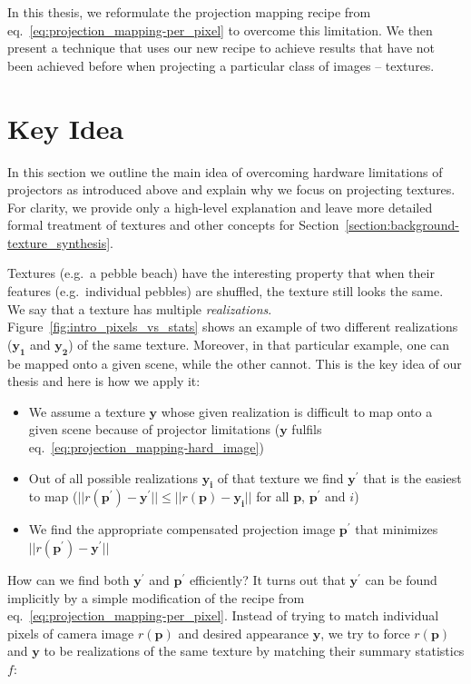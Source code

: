 In this thesis, we reformulate the projection mapping recipe from eq.~\ref{eq:projection_mapping-per_pixel} to overcome this limitation. We then present a technique that uses our new recipe to achieve results that have not been achieved before when projecting a particular class of images -- textures.

\section{Key Idea}
\label{section:intro-key_idea}

In this section we outline the main idea of overcoming hardware limitations of projectors as introduced above and explain why we focus on projecting textures. For clarity, we provide only a high-level explanation and leave more detailed formal treatment of textures and other concepts for Section~\ref{section:background-texture_synthesis}.

Textures (e.g.~a pebble beach) have the interesting property that when their features (e.g.~individual pebbles) are shuffled, the texture still looks the same. We say that a texture has multiple \textit{realizations}. Figure~\ref{fig:intro_pixels_vs_stats} shows an example of two different realizations (\(\bm{y_1}\) and \(\bm{y_2}\)) of the same texture. Moreover, in that particular example, one can be mapped onto a given scene, while the other cannot. This is the key idea of our thesis and here is how we apply it:

\begin{itemize}
    \item We assume a texture \(\bm{y}\) whose given realization is difficult to map onto a given scene because of projector limitations (\(\bm{y}\) fulfils eq.~\ref{eq:projection_mapping-hard_image})
    \item Out of all possible realizations \(\bm{y_i}\) of that texture we find \(\bm{y^\prime}\) that is the easiest to map (\(||r(\bm{p^\prime}) - \bm{y^\prime}|| \leq ||r(\bm{p}) - \bm{y_i}||\) for all \(\bm{p}\), \(\bm{p^\prime}\) and \(i\))
    \item We find the appropriate compensated projection image \(\bm{p^\prime}\) that minimizes \(||r(\bm{p^\prime}) - \bm{y^\prime}||\)
\end{itemize}

How can we find both \(\bm{y^\prime}\) and \(\bm{p^\prime}\) efficiently? It turns out that \(\bm{y^\prime}\) can be found implicitly by a simple modification of the recipe from eq.~\ref{eq:projection_mapping-per_pixel}. Instead of trying to match individual pixels of camera image \(r(\bm{p})\) and desired appearance \(\bm{y}\), we try to force \(r(\bm{p})\) and \(\bm{y}\) to be realizations of the same texture by matching their summary statistics \(f\):

